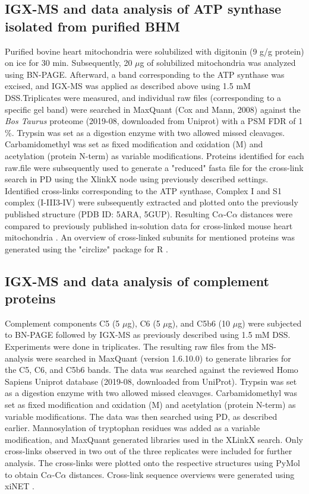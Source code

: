 \subsection*{IGX-MS and data analysis of ATP synthase isolated from purified BHM}
Purified bovine heart mitochondria were solubilized with digitonin (9 g/g protein) on ice for 30 min. Subsequently, 20 $\mu$g of solubilized mitochondria was analyzed using BN-PAGE. Afterward, a band corresponding to the ATP synthase was excised, and IGX-MS was applied as described above using 1.5 mM DSS.Triplicates were measured, and individual raw files (corresponding to a specific gel band) were searched in MaxQuant (Cox and Mann, 2008) against the \emph{Bos Taurus} proteome (2019-08, downloaded from Uniprot) with a PSM FDR of 1 \%. Trypsin was set as a digestion enzyme with two allowed missed cleavages. Carbamidomethyl was set as fixed modification and oxidation (M) and acetylation (protein N-term) as variable modifications. Proteins identified for each raw.file were subsequently used to generate a "reduced" fasta file for the cross-link search in PD using the XlinkX node using previously described settings. Identified cross-links corresponding to the ATP synthase, Complex I and S1 complex (I-III3-IV) were subsequently extracted and plotted onto the previously published structure (PDB ID: 5ARA, 5GUP). Resulting C$\alpha$-C$\alpha$ distances were compared to previously published in-solution data for cross-linked mouse heart mitochondria \cite{Liu_2018}. An overview of cross-linked subunits for mentioned proteins was generated using the "circlize" package for R \cite{Gu_2014}.
%
\subsection*{IGX-MS and data analysis of complement proteins}
Complement components C5 (5 $\mu$g), C6 (5 $\mu$g), and C5b6 (10 $\mu$g) were subjected to BN-PAGE followed by IGX-MS as previously described using 1.5 mM DSS. Experiments were done in triplicates. The resulting raw files from the MS-analysis were searched in MaxQuant (version 1.6.10.0) to generate libraries for the C5, C6, and C5b6 bands. The data was searched against the reviewed Homo Sapiens Uniprot database (2019-08, downloaded from UniProt). Trypsin was set as a digestion enzyme with two allowed missed cleavages. Carbamidomethyl was set as fixed modification and oxidation (M) and acetylation (protein N-term) as variable modifications. The data was then searched using PD, as described earlier. Mannosylation of tryptophan residues was added as a variable modification, and MaxQuant generated libraries used in the XLinkX search. Only cross-links observed in two out of the three replicates were included for further analysis. The cross-links were plotted onto the respective structures using PyMol to obtain C$\alpha$-C$\alpha$ distances. Cross-link sequence overviews were generated using xiNET \cite{Combe_2015}.
%
